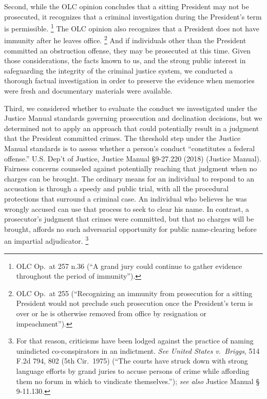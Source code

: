 Second, while the OLC opinion concludes that a sitting President may not be prosecuted, it recognizes that a criminal investigation during the President’s term is permissible.%
\footnote{OLC Op.\ at 257 n.36 (“A grand jury could continue to gather evidence throughout the period of immunity”).}
The OLC opinion also recognizes that a President does not have immunity after he leaves office.%
\footnote{OLC Op.\ at 255 (“Recognizing an immunity from prosecution for a sitting President would not preclude such prosecution once the President’s term is over or he is otherwise removed from office by resignation or impeachment”).}
And if individuals other than the President committed an obstruction offense, they may be prosecuted at this time.
Given those considerations, the facts known to us, and the strong public interest in safeguarding the integrity of the criminal justice system, we conducted a thorough factual investigation in order to preserve the evidence when memories were fresh and documentary materials were available.

Third, we considered whether to evaluate the conduct we investigated under the Justice Manual standards governing prosecution and declination decisions, but we determined not to apply an approach that could potentially result in a judgment that the President committed crimes.
The threshold step under the Justice Manual standards is to assess whether a person’s conduct
“constitutes a federal offense.”
U.S. Dep’t of Justice, Justice Manual \S 9-27.220 (2018) (Justice Manual).
Fairness concerns counseled against potentially reaching that judgment when no charges can be brought.
The ordinary means for an individual to respond to an accusation is through a speedy and public trial, with all the procedural protections that surround a criminal case.
An individual who believes he was wrongly accused can use that process to seek to clear his name.
In contrast, a prosecutor’s judgment that crimes were committed, but that no charges will be brought, affords no such adversarial opportunity for public name-clearing before an impartial adjudicator.%
\footnote{For that reason, criticisms have been lodged against the practice of naming unindicted co-conspirators in an indictment.
\textit{See United States v.\ Briggs}, 514 F.2d 794, 802 (5th Cir.~1975) (“The courts have struck down with strong language efforts by grand juries to accuse persons of crime while affording them no forum in which to vindicate themselves.”);
\textit{see also} Justice Manual § 9-11.130.}

